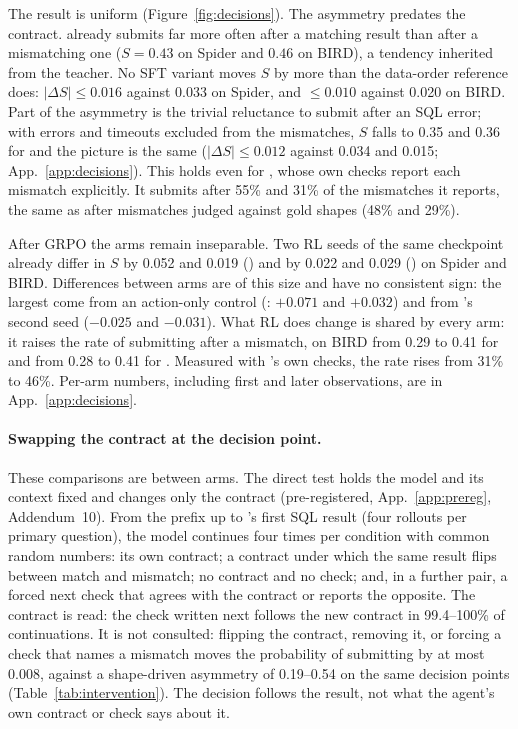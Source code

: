 The result is uniform (Figure~\ref{fig:decisions}).
The asymmetry predates the contract. \armA{} already submits far more often after a matching result than after a mismatching one ($S=0.43$ on Spider and $0.46$ on BIRD), a tendency inherited from the teacher. No SFT variant moves $S$ by more than the data-order reference does: $|\Delta S|\le0.016$ against 0.033 on Spider, and $\le0.010$ against 0.020 on BIRD. Part of the asymmetry is the trivial reluctance to submit after an SQL error; with errors and timeouts excluded from the mismatches, $S$ falls to 0.35 and 0.36 for \armA{} and the picture is the same ($|\Delta S|\le0.012$ against 0.034 and 0.015; App.~\ref{app:decisions}). This holds even for \armG{}, whose own checks report each mismatch explicitly. It submits after 55\% and 31\% of the mismatches it reports, the same as \armA{} after mismatches judged against gold shapes (48\% and 29\%).

After GRPO the arms remain inseparable. Two RL seeds of the same checkpoint already differ in $S$ by 0.052 and 0.019 (\armA{}) and by 0.022 and 0.029 (\armB{}) on Spider and BIRD. Differences between arms are of this size and have no consistent sign: the largest come from an action-only control (\armC{}: $+0.071$ and $+0.032$) and from \armB's second seed ($-0.025$ and $-0.031$). What RL does change is shared by every arm: it raises the rate of submitting after a mismatch, on BIRD from 0.29 to 0.41 for \armA{} and from 0.28 to 0.41 for \armG{}. Measured with \armG's own checks, the rate rises from 31\% to 46\%. Per-arm numbers, including first and later observations, are in App.~\ref{app:decisions}.

\paragraph{Swapping the contract at the decision point.}
These comparisons are between arms. The direct test holds the model and its context fixed and changes only the contract (pre-registered, App.~\ref{app:prereg}, Addendum~10). From the prefix up to \armG's first SQL result (four rollouts per primary question), the model continues four times per condition with common random numbers: its own contract; a contract under which the same result flips between match and mismatch; no contract and no check; and, in a further pair, a forced next check that agrees with the contract or reports the opposite. The contract is read: the check written next follows the new contract in 99.4--100\% of continuations. It is not consulted: flipping the contract, removing it, or forcing a check that names a mismatch moves the probability of submitting by at most 0.008, against a shape-driven asymmetry of 0.19--0.54 on the same decision points (Table~\ref{tab:intervention}). The decision follows the result, not what the agent's own contract or check says about it.

